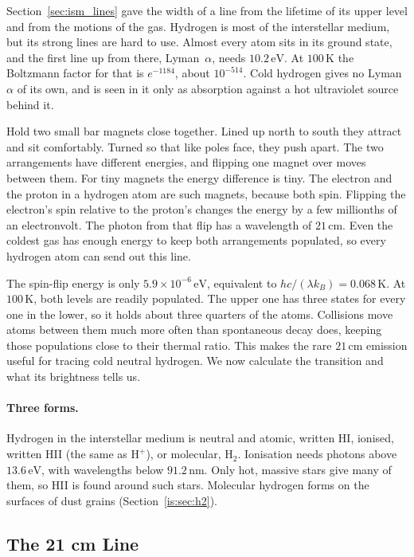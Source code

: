 Section~\ref{sec:ism_lines} gave the width of a line from the lifetime of its upper level and from the motions of the gas. Hydrogen is most of the interstellar medium, but its strong lines are hard to use. Almost every atom sits in its ground state, and the first line up from there, Lyman~$\alpha$, needs $10.2\,\mathrm{eV}$. At $100\,\mathrm K$ the Boltzmann factor for that is $e^{-1184}$, about $10^{-514}$. Cold hydrogen gives no Lyman~$\alpha$ of its own, and is seen in it only as absorption against a hot ultraviolet source behind it.

Hold two small bar magnets close together. Lined up north to south they attract and sit comfortably. Turned so that like poles face, they push apart. The two arrangements have different energies, and flipping one magnet over moves between them. For tiny magnets the energy difference is tiny. The electron and the proton in a hydrogen atom are such magnets, because both spin. Flipping the electron's spin relative to the proton's changes the energy by a few millionths of an electronvolt. The photon from that flip has a wavelength of $21\,\mathrm{cm}$. Even the coldest gas has enough energy to keep both arrangements populated, so every hydrogen atom can send out this line.

The spin-flip energy is only $5.9\times10^{-6}\,\mathrm{eV}$, equivalent to $hc/(\lambda k_B)=0.068\,\mathrm K$. At $100\,\mathrm K$, both levels are readily populated. The upper one has three states for every one in the lower, so it holds about three quarters of the atoms. Collisions move atoms between them much more often than spontaneous decay does, keeping those populations close to their thermal ratio. This makes the rare $21\,\mathrm{cm}$ emission useful for tracing cold neutral hydrogen. We now calculate the transition and what its brightness tells us.

\paragraph{Three forms.} Hydrogen in the interstellar medium is neutral and atomic, written HI, ionised, written HII (the same as $\mathrm{H^+}$), or molecular, $\mathrm{H_2}$. Ionisation needs photons above $13.6\,\mathrm{eV}$, with wavelengths below $91.2\,\mathrm{nm}$. Only hot, massive stars give many of them, so HII is found around such stars. Molecular hydrogen forms on the surfaces of dust grains (Section~\ref{is:sec:h2}).

\subsection{The 21 cm Line}
\label{is:sec:21cm}

